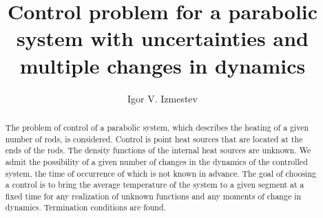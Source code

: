 \begin{englishtitle} %
\title{Control problem for a parabolic system with uncertainties and multiple changes in dynamics}
\author{Igor V. Izmestev 
}

\maketitle

\begin{abstract}

The problem of control of a parabolic system, which describes the heating of a given number of rods, is considered. Control is point heat sources that are located at the ends of the rods. The density functions of the internal heat sources are unknown. We admit the possibility of a given number of changes in the dynamics of the controlled system, the time of occurrence of which is not known in advance. The goal of choosing a control is to bring the average temperature of the system to a given segment at a fixed time for any realization of unknown functions and any moments of change in dynamics. Termination conditions are found.

\end{abstract}
\end{englishtitle}


\iffalse
%
%


\documentclass[12pt]{llncs}  


\usepackage{iftex}

\ifPDFTeX
\usepackage[T2A]{fontenc}
\usepackage[utf8]{inputenc} %
\usepackage[english,russian]{babel}
\fi

\usepackage{todonotes} 

